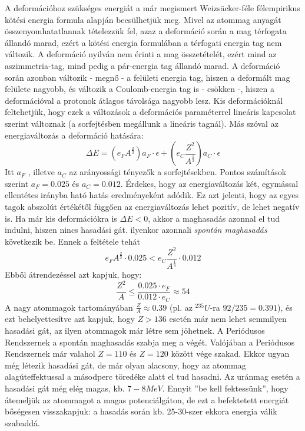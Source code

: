 \documentclass[../main.tex]{subfiles}
\begin{document}
A deformációhoz szükséges energiát a már megismert Weizsäcker-féle félempirikus kötési energia formula alapján becsülhetjük meg. Mivel az atommag anyagát
összenyomhatatlannak tételezzük fel, azaz a deformáció során a mag térfogata állandó
marad, ezért a kötési energia formulában a térfogati energia tag nem változik. A deformáció nyilván nem érinti a mag összetételét, ezért mind az aszimmetria-tag, mind pedig
a pár-energia tag állandó marad. A deformáció során azonban változik - megnő - a felületi energia tag, hiszen a deformált mag felülete nagyobb, és változik a Coulomb-energia
tag is - csökken -, hiszen a deformációval a protonok átlagos távolsága nagyobb lesz. Kis
deformációknál feltehetjük, hogy ezek a változások a deformációs paraméterrel lineáris
kapcsolat szerint változnak (a sorfejtésben megállunk a lineáris tagnál). Más szóval az
energiaváltozás a deformáció hatására:
\begin{equation}
    \Delta E = \left(e_F A^{\frac{2}{3}}\right)a_F \cdot \epsilon + \left(e_C \frac{Z^2}{A^{\frac{1}{3}}}\right)a_C \cdot \epsilon
\end{equation}
Itt $a_F$ , illetve $a_C$ az arányossági tényezők a sorfejtésekben. Pontos számítások szerint
$a_F = 0.025$ és $a_C = 0.012$. Érdekes, hogy az energiaváltozás két, egymással ellentétes
irányba ható hatás eredményeként adódik. Ez azt jelenti, hogy az egyes tagok abszolút
értékétől függően az energiaváltozás lehet pozitív, de lehet negatív is. Ha már kis deformációkra is $\Delta E < 0$, akkor a maghasadás azonnal el tud indulni, hiszen nincs hasadási gát.
ilyenkor azonnali \textit{spontán maghasadás} következik be. Ennek a feltétele tehát
\begin{equation}
    e_F A^{\frac{2}{3}} \cdot 0.025 < e_C \frac{Z^2}{A^{\frac{1}{3}}} \cdot 0.012
\end{equation}
Ebből átrendezéssel azt kapjuk, hogy:
\begin{equation}
    \frac{Z^2}{A} \leq \frac{0.025 \cdot e_F}{0.012 \cdot e_C} \approx 54
\end{equation}
A nagy atommagok tartományában $\frac{Z}{A} \approx 0.39$ (pl. az $^{235}U$-ra $92/235=0.391$), és ezt
behelyettesítve azt kapjuk, hogy $Z > 136$ esetén már nem lehet semmilyen hasadási
gát, az ilyen atommagok már létre sem jöhetnek. A Periódusos Rendszernek a spontán
maghasadás szabja meg a végét. Valójában a Periódusos Rendszernek már valahol $Z=110$
és $Z=120$ között vége szakad. Ekkor ugyan még létezik hasadási gát, de már olyan
alacsony, hogy az atommag alagúteffektussal a másodperc töredéke alatt el tud hasadni.
Az uránmag esetén a hasadási gát még elég magas, kb. $7-8 MeV$. Ennyit ”be kell
fektessünk”, hogy átemeljük az atommagot a magas potenciálgáton, de ezt a befektetett
energiát bőségesen visszakapjuk: a hasadás során kb. 25-30-szer ekkora energia válik
szabaddá.
\end{document}
